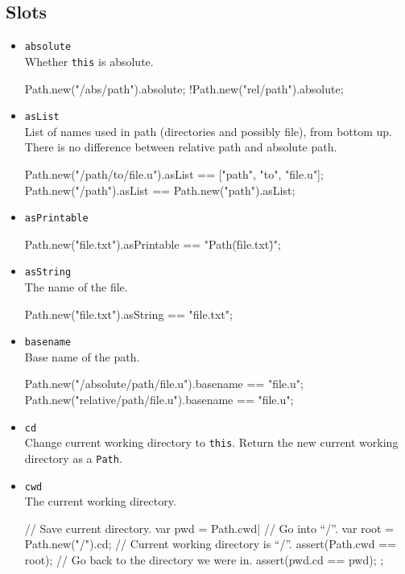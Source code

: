 \subsection{Slots}
\begin{itemize}
\item \lstinline|absolute|\\
  Whether \lstinline|this| is absolute.
\begin{urbiassert}[firstnumber=last]
Path.new("/abs/path").absolute;
!Path.new("rel/path").absolute;
\end{urbiassert}

\item \lstinline|asList|\\
  List of names used in path (directories and possibly file), from
  bottom up. There is no difference between relative path and absolute
  path.
\begin{urbiassert}[firstnumber=last]
Path.new("/path/to/file.u").asList == ["path", "to", "file.u"];
Path.new("/path").asList           == Path.new("path").asList;
\end{urbiassert}

\item \lstinline|asPrintable|\\
\begin{urbiassert}[firstnumber=last]
Path.new("file.txt").asPrintable == "Path(\"file.txt\")";
\end{urbiassert}

\item \lstinline|asString|\\
  The name of the file.
\begin{urbiassert}[firstnumber=last]
Path.new("file.txt").asString == "file.txt";
\end{urbiassert}

\item \lstinline|basename|\\
  Base name of the path.
\begin{urbiassert}[firstnumber=last]
Path.new("/absolute/path/file.u").basename == "file.u";
Path.new("relative/path/file.u").basename  == "file.u";
\end{urbiassert}

\item \lstinline|cd|\\
  Change current working directory to \lstinline|this|. Return the new
  current working directory as a \lstinline|Path|.

\item \lstinline|cwd|\\
  The current working directory.
\begin{urbiscript}[firstnumber=last]
{
  // Save current directory.
  var pwd = Path.cwd|
  // Go into ``/''.
  var root = Path.new("/").cd;
  // Current working directory is ``/''.
  assert(Path.cwd == root);
  // Go back to the directory we were in.
  assert(pwd.cd == pwd);
};
\end{urbiscript}


\end{itemize}
